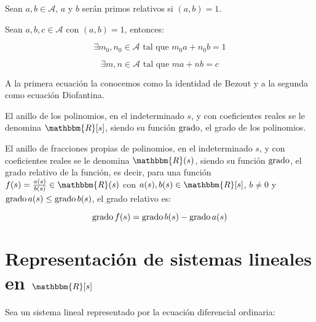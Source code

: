         \begin{definicion}
            Sean $a, b \in \mathcal{A}$, $a$ y $b$ serán primos relativos si $(a, b) = 1$.
        \end{definicion}

        \begin{lema}
            Sean $a, b, c \in \mathcal{A}$ con $(a, b) = 1$, entonces:

            \begin{equation}
                \exists m_0, n_0 \in \mathcal{A} \text{ tal que } m_0 a + n_0 b = 1
            \end{equation}

            \begin{equation}  \label{eq:anillos0}
                \exists m, n \in \mathcal{A} \text{ tal que } m a + n b = c
            \end{equation}

            A la primera ecuación la conocemos como la identidad de Bezout y a la segunda como ecuación Diofantina.
        \end{lema}

        \begin{definicion}
            El anillo de los polinomios, en el indeterminado $s$, y con coeficientes reales se le denomina $\mathbbm{R}[s]$, siendo su función $\operatorname{grado}$, el grado de los polinomios.

            El anillo de fracciones propias de polinomios, en el indeterminado $s$, y con coeficientes reales se le denomina $\mathbbm{R}(s)$, siendo su función $\operatorname{grado}$, el grado relativo de la función, es decir, para una función $f(s) = \frac{a(s)}{b(s)} \in \mathbbm{R}(s)$ con $a(s), b(s) \in \mathbbm{R}[s]$, $b \ne 0$ y $\operatorname{grado}{a(s)} \le \operatorname{grado}{b(s)}$, el grado relativo es:

            \begin{equation*}
                \operatorname{grado}{f(s)} = \operatorname{grado}{b(s)} - \operatorname{grado}{a(s)}
            \end{equation*}
        \end{definicion}

    \newpage
    \section{Representación de sistemas lineales en $\mathbbm{R}[s]$}

        Sea un sistema lineal representado por la ecuación diferencial ordinaria:


